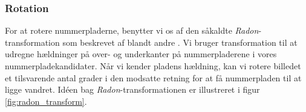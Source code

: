 

\subsubsection{Rotation}
For at rotere nummerpladerne, benytter vi os af den såkaldte \textit{Radon}-transformation som beskrevet af blandt andre \cite{shapiro}. Vi bruger transformation til at udregne hældninger på over- og underkanter på nummerpladerene i vores nummerpladekandidater. Når vi kender pladens hældning, kan vi rotere billedet et tilsvarende antal grader i den modsatte retning for at få nummerpladen til at ligge vandret. Idéen bag \textit{Radon}-transformationen er illustreret i figur \vref{fig:radon_transform}. 








